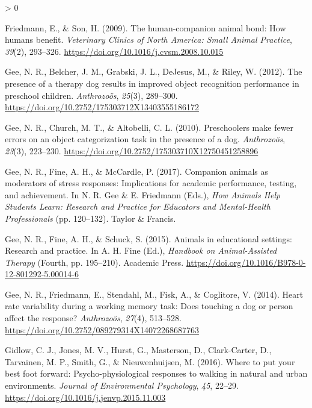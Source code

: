 \documentclass[
  english,
  pub,floatsintext]{apa6}
\newlength{\cslhangindent}
\newenvironment{CSLReferences}[2] %
 {%
  \setlength{\parindent}{0pt}
  \ifodd #1 \everypar{\setlength{\hangindent}{\cslhangindent}}\ignorespaces\fi
  \ifnum #2 > 0
  \setlength{\parskip}{#2\baselineskip}
  \fi
 }%
 {}
\begin{document}
\begin{CSLReferences}{1}{0}
\leavevmode\hypertarget{ref-Friedmann.Son.2009}{}%
Friedmann, E., \& Son, H. (2009). The human-companion animal bond: {How} humans benefit. \emph{Veterinary Clinics of North America: Small Animal Practice}, \emph{39}(2), 293--326. \url{https://doi.org/10.1016/j.cvsm.2008.10.015}

\leavevmode\hypertarget{ref-Gee.etal.2012}{}%
Gee, N. R., Belcher, J. M., Grabski, J. L., DeJesus, M., \& Riley, W. (2012). The presence of a therapy dog results in improved object recognition performance in preschool children. \emph{Anthrozoös}, \emph{25}(3), 289--300. \url{https://doi.org/10.2752/175303712X13403555186172}

\leavevmode\hypertarget{ref-Gee.etal.2010}{}%
Gee, N. R., Church, M. T., \& Altobelli, C. L. (2010). Preschoolers make fewer errors on an object categorization task in the presence of a dog. \emph{Anthrozoös}, \emph{23}(3), 223--230. \url{https://doi.org/10.2752/175303710X12750451258896}

\leavevmode\hypertarget{ref-Gee.etal.2017b}{}%
Gee, N. R., Fine, A. H., \& McCardle, P. (2017). Companion animals as moderators of stress responses: Implications for academic performance, testing, and achievement. In N. R. Gee \& E. Friedmann (Eds.), \emph{How {Animals Help Students Learn}: {Research} and {Practice} for {Educators} and {Mental}-{Health Professionals}} (pp. 120--132). {Taylor \& Francis}.

\leavevmode\hypertarget{ref-Gee.etal.2015}{}%
Gee, N. R., Fine, A. H., \& Schuck, S. (2015). Animals in educational settings: {Research} and practice. In A. H. Fine (Ed.), \emph{Handbook on {Animal}-{Assisted Therapy}} (Fourth, pp. 195--210). {Academic Press}. \url{https://doi.org/10.1016/B978-0-12-801292-5.00014-6}

\leavevmode\hypertarget{ref-Gee.etal.2014}{}%
Gee, N. R., Friedmann, E., Stendahl, M., Fisk, A., \& Coglitore, V. (2014). Heart rate variability during a working memory task: {Does} touching a dog or person affect the response? \emph{Anthrozoös}, \emph{27}(4), 513--528. \url{https://doi.org/10.2752/089279314X14072268687763}

\leavevmode\hypertarget{ref-Gidlow.etal.2016}{}%
Gidlow, C. J., Jones, M. V., Hurst, G., Masterson, D., Clark-Carter, D., Tarvainen, M. P., Smith, G., \& Nieuwenhuijsen, M. (2016). Where to put your best foot forward: {Psycho}-physiological responses to walking in natural and urban environments. \emph{Journal of Environmental Psychology}, \emph{45}, 22--29. \url{https://doi.org/10.1016/j.jenvp.2015.11.003}


\end{CSLReferences}
\end{document}
